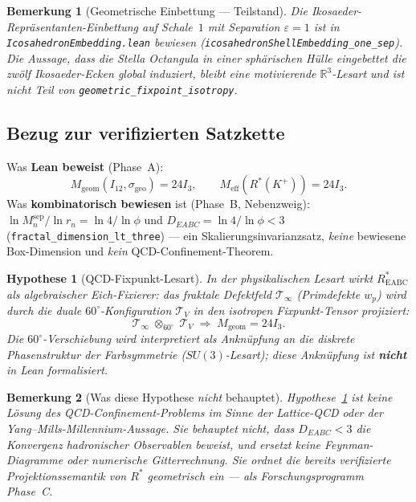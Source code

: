 \documentclass[11pt,a4paper]{article}
\newtheorem{remark}{Bemerkung}
\newtheorem{hypothesis}{Hypothese}
\begin{document}
	\begin{remark}[Geometrische Einbettung --- Teilstand]
		Die Ikosaeder-Repräsentanten-Einbettung auf Schale~$1$ mit Separation
		$\varepsilon=1$ ist in \texttt{IcosahedronEmbedding.lean} bewiesen
		(\texttt{icosahedronShellEmbedding\_one\_sep}).
		Die Aussage, dass die Stella Octangula in einer sphärischen Hülle eingebettet
		die zwölf Ikosaeder-Ecken \emph{global} induziert, bleibt eine motivierende
		$\mathbb{R}^3$-Lesart und ist nicht Teil von \texttt{geometric\_fixpoint\_isotropy}.
	\end{remark}
	
	\subsection{Bezug zur verifizierten Satzkette}
	
	Was \textbf{Lean beweist} (Phase~A):
	\[
	M_{\mathrm{geom}}(I_{12},\sigma_{\mathrm{geo}})=24I_3,
	\qquad
	M_{\mathrm{eff}}(R^*(K^+))=24I_3.
	\]
	Was \textbf{kombinatorisch bewiesen} ist (Phase~B, Nebenzweig):
	$\ln M_n^{\mathrm{sep}}/\ln r_n=\ln4/\ln\phi$ und $D_{EABC}=\ln4/\ln\phi<3$
	(\texttt{fractal\_dimension\_lt\_three}) --- ein Skalierungsinvarianzsatz,
	\emph{keine} bewiesene Box-Dimension und \emph{kein} QCD-Confinement-Theorem.
	
	\begin{hypothesis}[QCD-Fixpunkt-Lesart]
		\label{hyp:qcd-gauge-fix}
		In der physikalischen Lesart wirkt $R^*_{\mathrm{EABC}}$ als algebraischer
		\emph{Eich-Fixierer}: das fraktale Defektfeld $\mathcal{T}_\infty$ (Primdefekte $w_p$)
		wird durch die duale $60^\circ$-Konfiguration $\mathcal{T}_V$ in den isotropen
		Fixpunkt-Tensor projiziert:
		\[
		\mathcal{T}_\infty \;\otimes_{60^\circ}\; \mathcal{T}_V
		\;\Longrightarrow\;
		M_{\mathrm{geom}} = 24I_3.
		\]
		Die $60^\circ$-Verschiebung wird \emph{interpretiert} als Anknüpfung an die diskrete
		Phasenstruktur der Farbsymmetrie ($SU(3)$-Lesart); diese Anknüpfung ist
		\textbf{nicht} in Lean formalisiert.
	\end{hypothesis}
	
	\begin{remark}[Was diese Hypothese \emph{nicht} behauptet]
		Hypothese~\ref{hyp:qcd-gauge-fix} ist keine Lösung des QCD-Confinement-Problems
		im Sinne der Lattice-QCD oder der Yang--Mills-Millennium-Aussage.
		Sie behauptet nicht, dass $D_{EABC}<3$ die Konvergenz hadronischer Observablen
		beweist, und ersetzt keine Feynman-Diagramme oder numerische Gitterrechnung.
		Sie ordnet die \emph{bereits verifizierte} Projektionssemantik von $R^*$
		geometrisch ein --- als Forschungsprogramm Phase~C.
	\end{remark}
	
\end{document}
